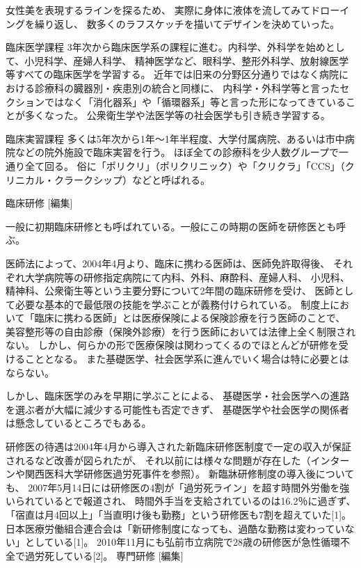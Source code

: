 女性美を表現するラインを探るため、
実際に身体に液体を流してみてドローイングを繰り返し、
数多くのラフスケッチを描いてデザインを決めていった。


臨床医学課程
3年次から臨床医学系の課程に進む。内科学、外科学を始めとして、小児科学、産婦人科学、
精神医学など、眼科学、整形外科学、放射線医学等すべての臨床医学を学習する。
近年では旧来の分野区分通りではなく病院における診療科の臓器別・疾患別の統合と同様に、
内科学・外科学等と言ったセクションではなく「消化器系」や「循環器系」等と言った形になってきていることが多くなった。
公衆衛生学や法医学等の社会医学も引き続き学習する。

臨床実習課程
多くは5年次から1年～1年半程度、大学付属病院、あるいは市中病院などの院外施設で臨床実習を行う。
ほぼ全ての診療科を少人数グループで一通り全て回る。
俗に「ポリクリ」（ポリクリニック）や「クリクラ」「CCS」（クリニカル・クラークシップ）などと呼ばれる。

臨床研修 [編集]

一般に初期臨床研修とも呼ばれている。一般にこの時期の医師を研修医とも呼ぶ。

医師法によって、2004年4月より、臨床に携わる医師は、医師免許取得後、
それぞれ大学病院等の研修指定病院にて内科、外科、麻酔科、産婦人科、
小児科、精神科、公衆衛生等という主要分野について2年間の臨床研修を受け、
医師として必要な基本的で最低限の技能を学ぶことが義務付けられている。
制度上において「臨床に携わる医師」とは医療保険による保険診療を行う医師のことで、
美容整形等の自由診療（保険外診療）を行う医師においては法律上全く制限されない。
しかし、何らかの形で医療保険は関わってくるのでほとんどが研修を受けることとなる。
また基礎医学、社会医学系に進んでいく場合は特に必要とはならない。

しかし、臨床医学のみを早期に学ぶことによる、
基礎医学・社会医学への進路を選ぶ者が大幅に減少する可能性も否定できず、
基礎医学や社会医学の関係者は懸念しているところでもある。

研修医の待遇は2004年4月から導入された新臨床研修医制度で一定の収入が保証されるなど改善が図られたが、
それ以前には様々な問題が存在した（インターンや関西医科大学研修医過労死事件を参照）。
新臨牀研修制度の導入後についても、
2007年5月14日には研修医の4割が「過労死ライン」を超す時間外労働を強いられているとで報道され、
時間外手当を支給されているのは16.2％に過ぎず、
「宿直は月4回以上」「当直明け後も勤務」という研修医も7割を超えていた[1]。
日本医療労働組合連合会は「新研修制度になっても、過酷な勤務は変わっていない」としている[1]。
2010年11月にも弘前市立病院で28歳の研修医が急性循環不全で過労死している[2]。
専門研修 [編集]

